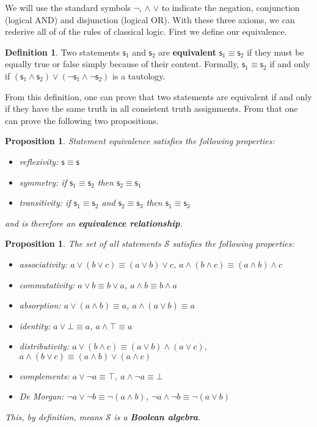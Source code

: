 \documentclass[letterpaper]{article}
\theoremstyle{plain}%
\newtheorem{prop}[thrm]{Proposition}
\theoremstyle{definition}
\newtheorem{defn}[thrm]{Definition}
\theoremstyle{remark}
\def\tautology{\top}
\def\contradiction{\bot}
\def\AND{\wedge}
\def\OR{\vee}
\def\NOT{\neg}
\newcommand{\stmt}[1][s] {\mathsf{#1}}
\begin{document}
We will use the standard symbols $\NOT$, $\AND$ $\OR$ to indicate the negation, conjunction (logical AND) and disjunction (logical OR). With these three axioms, we can rederive all of of the rules of classical logic. First we define our equivalence.

\begin{defn}
	Two statements $\stmt_1$ and $\stmt_2$ are \textbf{equivalent} $\stmt_1 \equiv \stmt_2$ if they must be equally true or false simply because of their content. Formally, $\stmt_1 \equiv \stmt_2$ if and only if $(\stmt_1 \AND \stmt_2) \OR (\NOT\stmt_1 \AND \NOT\stmt_2)$ is a tautology.
\end{defn}

From this definition, one can prove that two statements are equivalent if and only if they have the same truth in all consistent truth assignments. From that one can prove the following two propositions.

\begin{prop}
	Statement equivalence satisfies the following properties:
	\begin{itemize}
		\item reflexivity: $\stmt \equiv \stmt$
		\item symmetry: if $\stmt_1 \equiv \stmt_2$ then $\stmt_2 \equiv \stmt_1$
		\item transitivity: if $\stmt_1 \equiv \stmt_2$ and $\stmt_2 \equiv \stmt_3$ then $\stmt_1 \equiv \stmt_3$
	\end{itemize}
	and is therefore an \textbf{equivalence relationship}.
\end{prop}

\begin{prop}\label{boolean_properties}
	The set of all statements $\mathcal{S}$ satisfies the following properties:
	\begin{itemize}
		\item associativity: $a \OR (b \OR c) \equiv (a \OR b) \OR c$, $a \AND (b \AND c) \equiv (a \AND b) \AND c$
		\item commutativity: $a \OR b \equiv b \OR a$, $a \AND b \equiv b \AND a$
		\item absorption: $a \OR (a \AND b) \equiv a$, $a \AND (a \OR b) \equiv a$
		\item identity: $a \OR \contradiction \equiv a
		$, $a \AND \tautology \equiv a$
		\item distributivity: $a \OR (b \AND c) \equiv (a \OR b) \AND (a \OR c)$, $a \AND (b \OR c) \equiv (a \AND b) \OR (a \AND c)$
		\item complements: $a \OR \NOT a \equiv \tautology$, $a \AND \NOT a \equiv \contradiction$
		\item De Morgan: $\NOT a \OR \NOT b \equiv \NOT (a \AND b)$, $\NOT a \AND \NOT b \equiv \NOT (a \OR b)$
	\end{itemize}
	This, by definition, means $\mathcal{S}$ is a \textbf{Boolean algebra}.
\end{prop}
\end{document}
